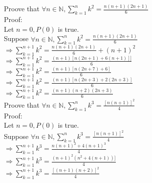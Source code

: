 \documentclass{article}
\begin{document}
\noindent Proove that $\forall n \in \mathbb{N}, \sum_{k=1}^{n}k^2 =
\frac{n(n+1)(2n+1)}{6}$\\

\noindent Proof:\\
Let $n = 0, P(0)$ is true.\\
Suppose $\forall n \in \mathbb{N}, \sum_{k=1}^{n}k^2 =
\frac{n(n+1)(2n+1)}{6}$\\
$\Rightarrow \sum_{k=1}^{n+1}k^2 = \frac{n(n+1)(2n+1)}{6} + (n+1)^2$\\
$\Rightarrow \sum_{k=1}^{n+1}k^2 = 
\frac{(n+1)[n(2n+1)+6(n+1)]]}{6}$\\
$\Rightarrow \sum_{k=1}^{n+1}k^2 = 
\frac{(n+1)[n(2n+7) + 6]}{6}$\\
$\Rightarrow \sum_{k=1}^{n+1}k^2 = 
\frac{(n+1)[n(2n+3) + 2(2n + 3)]}{6}$\\
$\Rightarrow \sum_{k=1}^{n+1}k^2 = 
\frac{(n+1)(n+2)(2n+3)}{6}$\\

\noindent Proove that $\forall n \in \mathbb{N}, \sum_{k=1}^{n}k^3 = 
\frac{[n(n+1)]^2}{4}$\\

\noindent Proof:\\
Let $n = 0, P(0)$ is true.\\
Suppose $\forall n \in \mathbb{N}, \sum_{k=1}^{n}k^3 = \frac{[n(n+1)]^2}{4}$\\
$\Rightarrow \sum_{k=1}^{n+1}k^3 = \frac{n(n+1)^2 + 4(n+1)^3}{4}$\\
$\Rightarrow \sum_{k=1}^{n+1}k^3 = \frac{(n+1)^2(n^2 + 4(n+1))]}{4}$\\
$\Rightarrow \sum_{k=1}^{n+1}k^3 = \frac{[(n+1)(n+2)]^2}{4}$
\end{document}
